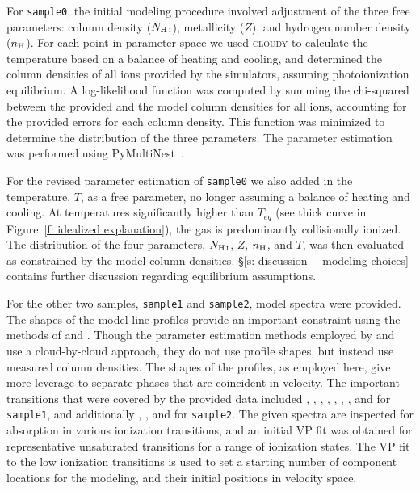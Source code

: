 \documentclass[fleqn,usenatbib]{mnras}
\begin{document}
For \texttt{sample0}, the initial modeling procedure involved adjustment of the three free parameters:
 column density ($N_{\ion{H}{I}}$), metallicity ($Z$), and hydrogen number density ($n_{\rm H}$).
For each point in parameter space we used \textsc{cloudy} to calculate the temperature based on a balance of heating and cooling,
and determined the column densities of all ions provided by the simulators, assuming photoionization equilibrium.
A log-likelihood function was computed by summing the chi-squared between the provided and the model column densities for all ions, accounting for the provided errors for each column density.
This function was minimized to determine the distribution of the three parameters.
The parameter estimation was performed using PyMultiNest~\citep{buchner2016Statistical}. 

For the revised parameter estimation of \texttt{sample0} we also added in the temperature, $T$, as a free parameter, no longer assuming a balance of heating and cooling.
At temperatures significantly higher than $T_{eq}$ (see thick curve in Figure~\ref{f: idealized explanation}), the gas is predominantly collisionally ionized.
The distribution of the four parameters, $N_{\ion{H}{I}}$, $Z$, $n_{\rm H}$, and $T$, was then evaluated as constrained by the model column densities.
\S\ref{s: discussion -- modeling choices} contains further discussion regarding equilibrium assumptions.

For the other two samples, \texttt{sample1} and \texttt{sample2}, model spectra were provided.
The shapes of the model line profiles provide an important constraint using the methods of \cite{sameer2021Cloudbycloud} and \cite{sameer2022Probing}.
Though the  parameter estimation methods employed by \cite{zahedy2019Probing} and \cite{haislmaier2021COS} use a cloud-by-cloud approach, they do not use profile shapes, but instead use measured column densities.
The shapes of the profiles, as employed here, give more leverage to separate phases that are coincident in velocity.
The important transitions that were covered by the provided  data included , , , , , , , and  for \texttt{sample1}, and additionally , , and  for \texttt{sample2}.
The given spectra are inspected for absorption in various ionization transitions, and an initial VP fit was obtained for representative unsaturated transitions for a range of ionization states.
The VP fit to the low ionization transitions is used to set a starting number of component locations for the modeling, and their initial positions in velocity space.
\end{document}
